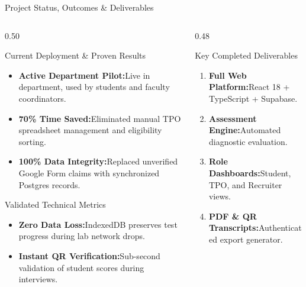 \documentclass[aspectratio=169,10pt,xcolor={table,dvipsnames}]{beamer}
\begin{document}
\begin{frame}[t]{Project Status, Outcomes \& Deliverables}
  \begin{columns}[T]
    \begin{column}{0.50\textwidth}
      \begin{navytitlecard}{Current Deployment \& Proven Results}
        \fontsize{6.8}{8.2}\selectfont
        \begin{itemize}\setlength{\itemsep}{1.2pt}
          \item \textbf{Active Department Pilot:}\;Live in department, used by students and faculty coordinators.
          \item \textbf{70\% Time Saved:}\;Eliminated manual TPO spreadsheet management and eligibility sorting.
          \item \textbf{100\% Data Integrity:}\;Replaced unverified Google Form claims with synchronized Postgres records.
        \end{itemize}
      \end{navytitlecard}

      \vspace{0.08cm}

      \begin{plaincard}{Validated Technical Metrics}
        \fontsize{6.8}{8.2}\selectfont
        \begin{itemize}\setlength{\itemsep}{1.2pt}
          \item \textbf{Zero Data Loss:}\;IndexedDB preserves test progress during lab network drops.
          \item \textbf{Instant QR Verification:}\;Sub-second validation of student scores during interviews.
        \end{itemize}
      \end{plaincard}
    \end{column}

    \begin{column}{0.48\textwidth}
      \begin{navytitlecard}{Key Completed Deliverables}
        \fontsize{6.8}{8.2}\selectfont
        \begin{enumerate}\setlength{\itemsep}{1pt}
          \item \textbf{Full Web Platform:}\;React 18 + TypeScript + Supabase.
          \item \textbf{Assessment Engine:}\;Automated diagnostic evaluation.
          \item \textbf{Role Dashboards:}\;Student, TPO, and Recruiter views.
          \item \textbf{PDF \& QR Transcripts:}\;Authenticated export generator.
        \end{enumerate}
      \end{navytitlecard}


\end{column}
\end{columns}
\end{frame}
\end{document}
